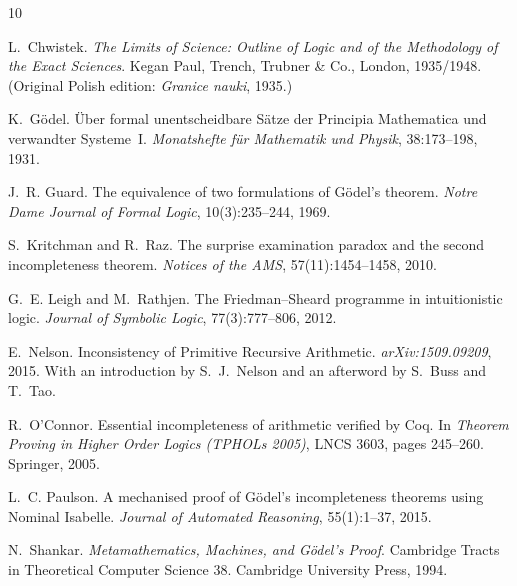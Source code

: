 \documentclass[11pt]{article}
\begin{document}

\begin{thebibliography}{10}

L.~Chwistek.
\newblock \emph{The Limits of Science: Outline of Logic and of the
  Methodology of the Exact Sciences}.
\newblock Kegan Paul, Trench, Trubner \& Co., London, 1935/1948.
\newblock (Original Polish edition: \emph{Granice nauki}, 1935.)

K.~G\"odel.
\newblock \"Uber formal unentscheidbare {S\"atze} der {Principia
  Mathematica} und verwandter {Systeme}~{I}.
\newblock \emph{Monatshefte f\"ur Mathematik und Physik}, 38:173--198,
  1931.

J.~R. Guard.
\newblock The equivalence of two formulations of {G\"odel's} theorem.
\newblock \emph{Notre Dame Journal of Formal Logic}, 10(3):235--244,
  1969.

S.~Kritchman and R.~Raz.
\newblock The surprise examination paradox and the second incompleteness
  theorem.
\newblock \emph{Notices of the AMS}, 57(11):1454--1458, 2010.

G.~E. Leigh and M.~Rathjen.
\newblock The {Friedman--Sheard} programme in intuitionistic logic.
\newblock \emph{Journal of Symbolic Logic}, 77(3):777--806, 2012.

E.~Nelson.
\newblock Inconsistency of {Primitive Recursive Arithmetic}.
\newblock \emph{arXiv:1509.09209}, 2015.
\newblock With an introduction by S.~J.~Nelson and an afterword by
  S.~Buss and T.~Tao.

R.~O'Connor.
\newblock Essential incompleteness of arithmetic verified by {Coq}.
\newblock In \emph{Theorem Proving in Higher Order Logics (TPHOLs 2005)},
  LNCS 3603, pages 245--260. Springer, 2005.

L.~C. Paulson.
\newblock A mechanised proof of {G\"odel's} incompleteness theorems
  using {Nominal Isabelle}.
\newblock \emph{Journal of Automated Reasoning}, 55(1):1--37, 2015.

N.~Shankar.
\newblock \emph{Metamathematics, Machines, and {G\"odel's} Proof}.
\newblock Cambridge Tracts in Theoretical Computer Science 38.
  Cambridge University Press, 1994.

\end{thebibliography}
\end{document}
